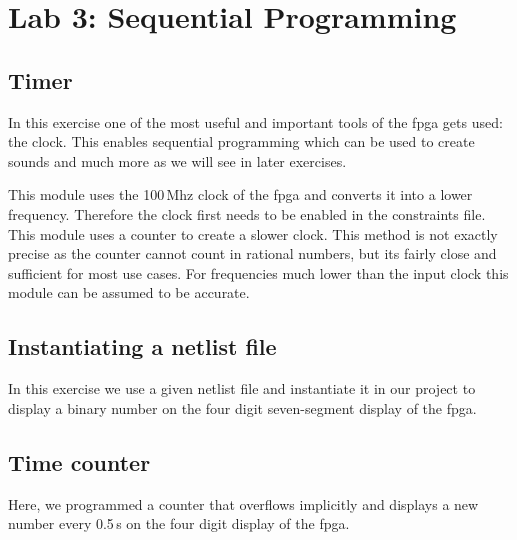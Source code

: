 \chapter{Lab 3: Sequential Programming} \label{day3}



\section{Timer}

In this exercise one of the most useful and important tools of the \gls{fpga} gets used: the clock. This enables sequential programming which can be used to create sounds and much more as we will see in later exercises.

This module uses the 100\,Mhz clock of the \gls{fpga} and converts it into a lower frequency. Therefore the clock first needs to be enabled in the constraints file. This module uses a counter to create a slower clock. This method is not exactly precise as the counter cannot count in rational numbers, but its fairly close and sufficient for most use cases. For frequencies much lower than the input clock this module can be assumed to be accurate.





\section{Instantiating a netlist file}

In this exercise we use a given netlist file and instantiate it in our project to display a binary number on the four digit seven-segment display of the \gls{fpga}. 



\section{Time counter}

Here, we programmed a counter that overflows implicitly and displays a new number every 0.5\,s on the four digit display of the \gls{fpga}. 

